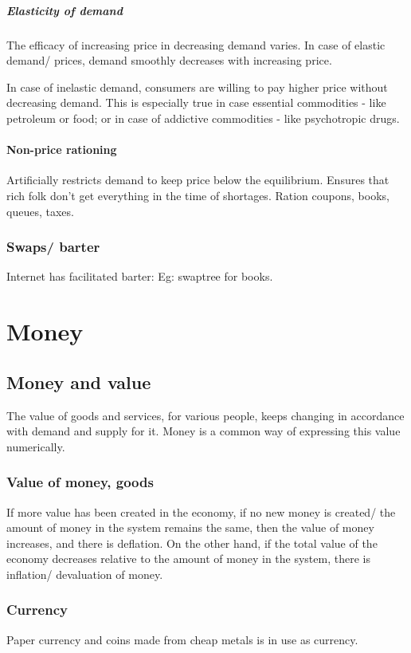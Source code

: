 \documentclass[oneside, article]{memoir}
\begin{document}
\paragraph{Elasticity of demand}
The efficacy of increasing price in decreasing demand varies. In case of elastic demand/ prices, demand smoothly decreases with increasing price.

In case of inelastic demand, consumers are willing to pay higher price without decreasing demand. This is especially true in case essential commodities - like petroleum or food; or in case of addictive commodities - like psychotropic drugs.

\subsubsection{Non-price rationing}
Artificially restricts demand to keep price below the equilibrium. Ensures that rich folk don't get everything in the time of shortages. Ration coupons, books, queues, taxes.

\subsection{Swaps/ barter}
Internet has facilitated barter: Eg: swaptree for books.

\chapter{Money}
\section{Money and value}
The value of goods and services, for various people, keeps changing in accordance with demand and supply for it. Money is a common way of expressing this value numerically.

\subsection{Value of money, goods}
If more value has been created in the economy, if no new money is created/ the amount of money in the system remains the same, then the value of money increases, and there is deflation. On the other hand, if the total value of the economy decreases relative to the amount of money in the system, there is inflation/ devaluation of money.

\subsection{Currency}
Paper currency and coins made from cheap metals is in use as currency.
\end{document}
